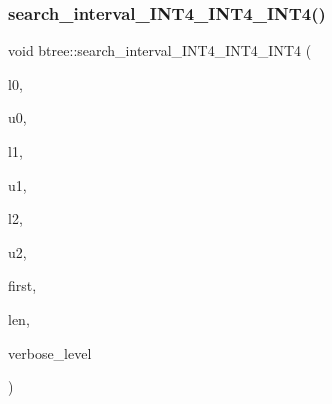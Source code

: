 \subsubsection{\texorpdfstring{search\+\_\+interval\+\_\+\+I\+N\+T4\+\_\+\+I\+N\+T4\+\_\+\+I\+N\+T4()}{search\_interval\_INT4\_INT4\_INT4()}}
{\footnotesize\ttfamily void btree\+::search\+\_\+interval\+\_\+\+I\+N\+T4\+\_\+\+I\+N\+T4\+\_\+\+I\+N\+T4 (\begin{DoxyParamCaption}\item[{\mbox{\hyperlink{galois_8h_a09fddde158a3a20bd2dcadb609de11dc}{I\+NT}}}]{l0,  }\item[{\mbox{\hyperlink{galois_8h_a09fddde158a3a20bd2dcadb609de11dc}{I\+NT}}}]{u0,  }\item[{\mbox{\hyperlink{galois_8h_a09fddde158a3a20bd2dcadb609de11dc}{I\+NT}}}]{l1,  }\item[{\mbox{\hyperlink{galois_8h_a09fddde158a3a20bd2dcadb609de11dc}{I\+NT}}}]{u1,  }\item[{\mbox{\hyperlink{galois_8h_a09fddde158a3a20bd2dcadb609de11dc}{I\+NT}}}]{l2,  }\item[{\mbox{\hyperlink{galois_8h_a09fddde158a3a20bd2dcadb609de11dc}{I\+NT}}}]{u2,  }\item[{\mbox{\hyperlink{galois_8h_a09fddde158a3a20bd2dcadb609de11dc}{I\+NT}} \&}]{first,  }\item[{\mbox{\hyperlink{galois_8h_a09fddde158a3a20bd2dcadb609de11dc}{I\+NT}} \&}]{len,  }\item[{\mbox{\hyperlink{galois_8h_a09fddde158a3a20bd2dcadb609de11dc}{I\+NT}}}]{verbose\+\_\+level }\end{DoxyParamCaption})}

\mbox{\label{classbtree_a5a22b7f3ea6107cda032f669c00ad3d9}} 

